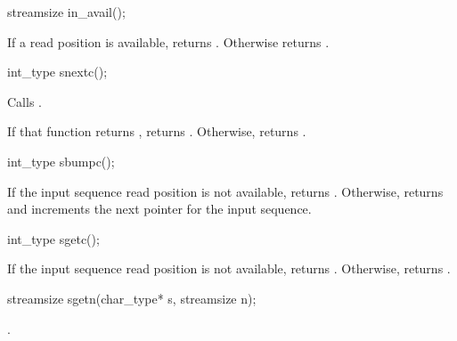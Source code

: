 %
\begin{itemdecl}
streamsize in_avail();
\end{itemdecl}

\begin{itemdescr}
\pnum
\returns
If a read position is available, returns
.
Otherwise returns
.
\end{itemdescr}

%
\begin{itemdecl}
int_type snextc();
\end{itemdecl}

\begin{itemdescr}
\pnum
\effects
Calls
.

\pnum
\returns
If that function returns
,
returns
.
Otherwise, returns
.
\end{itemdescr}

%
\begin{itemdecl}
int_type sbumpc();
\end{itemdecl}

\begin{itemdescr}
\pnum
\effects
If the input sequence read position is not available,
returns
.
Otherwise, returns
and increments the next pointer for the input sequence.
\end{itemdescr}

%
\begin{itemdecl}
int_type sgetc();
\end{itemdecl}

\begin{itemdescr}
\pnum
\returns
If the input sequence read position is not available,
returns
.
Otherwise, returns
.
\end{itemdescr}

%
\begin{itemdecl}
streamsize sgetn(char_type* s, streamsize n);
\end{itemdecl}

\begin{itemdescr}
\pnum
\returns
{}.
\end{itemdescr}

